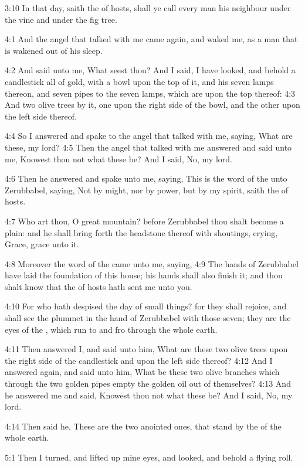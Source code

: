 3:10 In that day, saith the \LORD of hosts, shall ye call every man his neighbour under the vine and under the fig tree.

4:1 And the angel that talked with me came again, and waked me, as a man that is wakened out of his sleep.

4:2 And said unto me, What seest thou? And I said, I have looked, and behold a candlestick all of gold, with a bowl upon the top of it, and his seven lamps thereon, and seven pipes to the seven lamps, which are upon the top thereof: 4:3 And two olive trees by it, one upon the right side of the bowl, and the other upon the left side thereof.

4:4 So I answered and spake to the angel that talked with me, saying, What are these, my lord?  4:5 Then the angel that talked with me answered and said unto me, Knowest thou not what these be? And I said, No, my lord.

4:6 Then he answered and spake unto me, saying, This is the word of the \LORD unto Zerubbabel, saying, Not by might, nor by power, but by my spirit, saith the \LORD of hosts.

4:7 Who art thou, O great mountain? before Zerubbabel thou shalt become a plain: and he shall bring forth the headstone thereof with shoutings, crying, Grace, grace unto it.

4:8 Moreover the word of the \LORD came unto me, saying, 4:9 The hands of Zerubbabel have laid the foundation of this house; his hands shall also finish it; and thou shalt know that the \LORD of hosts hath sent me unto you.

4:10 For who hath despised the day of small things? for they shall rejoice, and shall see the plummet in the hand of Zerubbabel with those seven; they are the eyes of the \LORD, which run to and fro through the whole earth.

4:11 Then answered I, and said unto him, What are these two olive trees upon the right side of the candlestick and upon the left side thereof?  4:12 And I answered again, and said unto him, What be these two olive branches which through the two golden pipes empty the golden oil out of themselves?  4:13 And he answered me and said, Knowest thou not what these be? And I said, No, my lord.

4:14 Then said he, These are the two anointed ones, that stand by the \LORD of the whole earth.

5:1 Then I turned, and lifted up mine eyes, and looked, and behold a flying roll.


